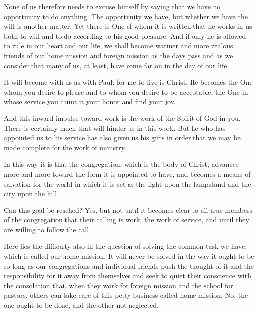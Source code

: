 None of us therefore needs to excuse himself by saying that we have no opportunity to do anything. The opportunity we have, but whether we have the will is another matter. Yet there is One of whom it is written that he works in us both to will and to do according to his good pleasure. And if only he is allowed to rule in our heart and our life, we shall become warmer and more zealous friends of our home mission and foreign mission as the days pass and as we consider that many of us, at least, have come far on in the day of our life.

It will become with us as with Paul: for me to live is Christ. He becomes the One whom you desire to please and to whom you desire to be acceptable, the One in whose service you count it your honor and find your joy.

And this inward impulse toward work is the work of the Spirit of God in you. There is certainly much that will hinder us in this work. But he who has appointed us to his service has also given us his gifts in order that we may be made complete for the work of ministry.

In this way it is that the congregation, which is the body of Christ, advances more and more toward the form it is appointed to have, and becomes a means of salvation for the world in which it is set as the light upon the lampstand and the city upon the hill.

Can this goal be reached? Yes, but not until it becomes clear to all true members of the congregation that their calling is work, the work of service, and until they are willing to follow the call.

Here lies the difficulty also in the question of solving the common task we have, which is called our home mission. It will never be solved in the way it ought to be so long as our congregations and individual friends push the thought of it and the responsibility for it away from themselves and seek to quiet their conscience with the consolation that, when they work for foreign mission and the school for pastors, others can take care of this petty business called home mission. No, the one ought to be done, and the other not neglected.
